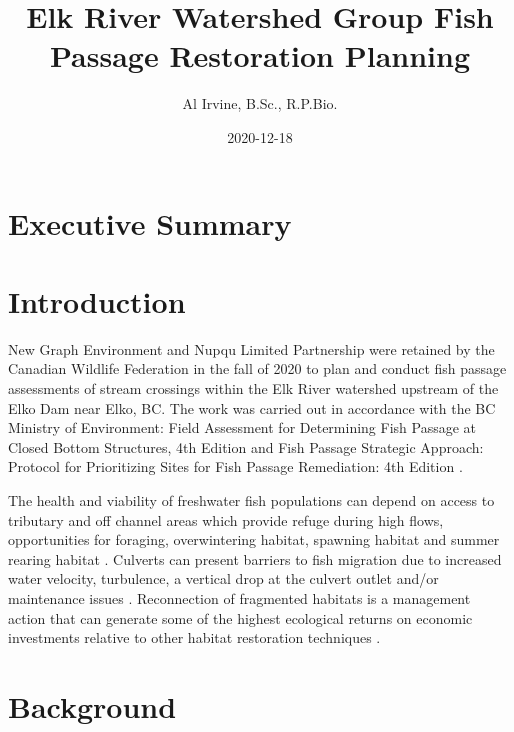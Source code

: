 \documentclass[
]{book}
\title{Elk River Watershed Group Fish Passage Restoration Planning}
\author{Al Irvine, B.Sc., R.P.Bio.}
\date{2020-12-18}
\begin{document}
\maketitle

{
\setcounter{tocdepth}{1}
\tableofcontents
}
\hypertarget{executive-summary}{%
\chapter*{Executive Summary}\label{executive-summary}}

\hypertarget{intro}{%
\chapter{Introduction}\label{intro}}

New Graph Environment and Nupqu Limited Partnership were retained by the Canadian Wildlife Federation in the fall of 2020 to plan and conduct fish passage assessments of stream crossings within the Elk River watershed upstream of the Elko Dam near Elko, BC. The work was carried out in accordance with the BC Ministry of Environment: Field Assessment for Determining Fish Passage at Closed Bottom Structures, 4th Edition \citep{fish_passage_assessments} and Fish Passage Strategic Approach: Protocol for Prioritizing Sites for Fish Passage Remediation: 4th Edition \citep{fishpassagetechnicalworkinggroupFishPassageStrategic2014}.

The health and viability of freshwater fish populations can depend on access to tributary and off channel areas which provide refuge during high flows, opportunities for foraging, overwintering habitat, spawning habitat and summer rearing habitat \citep{Bramblett_2002, swalesRoleOffChannelPonds1989}. Culverts can present barriers to fish migration due to increased water velocity, turbulence, a vertical drop at the culvert outlet and/or maintenance issues \citep{slaneyFishHabitatRehabilitation1997}. Reconnection of fragmented habitats is a management action that can generate some of the highest ecological returns on economic investments relative to other habitat restoration techniques \citep{saldicaromileStreamHabitatRestoration2004}.

\hypertarget{background}{%
\chapter{Background}\label{background}}
\end{document}
